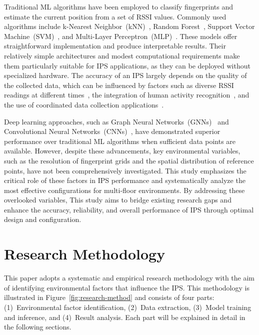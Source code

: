 \documentclass[runningheads]{llncs}
\begin{document}
Traditional ML algorithms have been employed to classify fingerprints and estimate the current position from a set of RSSI values. Commonly used algorithms include k-Nearest Neighbor~(kNN)~\cite{LRE1,LRE2,LRE6}, Random Forest~\cite{LRE1,LRE5,LRE6}, Support Vector Machine~(SVM)~\cite{add1,LRE1,LRE2,LRE6}, and Multi-Layer Perceptron~(MLP)~\cite{LRE1,LRE2}. These models offer straightforward implementation and produce interpretable results. Their relatively simple architectures and modest computational requirements make them particularly suitable for IPS applications, as they can be deployed without specialized hardware. The accuracy of an IPS largely depends on the quality of the collected data, which can be influenced by factors such as diverse RSSI readings at different times~\cite{LRE3}, the integration of human activity recognition~\cite{LRE4}, and the use of coordinated data collection applications~\cite{LRE7}.

Deep learning approaches, such as Graph Neural Networks~(GNNs)~\cite{LRE2} and Convolutional Neural Networks~(CNNs)~\cite{LRE4}, have demonstrated superior performance over traditional ML algorithms when sufficient data points are available. However, despite these advancements, key environmental variables, such as the resolution of fingerprint grids and the spatial distribution of reference points, have not been comprehensively investigated. This study emphasizes the critical role of these factors in IPS performance and systematically analyze the most effective configurations for multi-floor environments. By addressing these overlooked variables, This study aims to bridge existing research gaps and enhance the accuracy, reliability, and overall performance of IPS through optimal design and configuration.


\section{Research Methodology}\label{sec:research-method}

This paper adopts a systematic and empirical research methodology with the aim of identifying environmental factors that influence the IPS. This methodology is illustrated in Figure~\ref{fig:research-method} and consists of four parts: (1)~Environmental factor identification, (2)~Data extraction, (3)~Model training and inference, and (4)~Result analysis. Each part will be explained in detail in the following sections.
\end{document}
